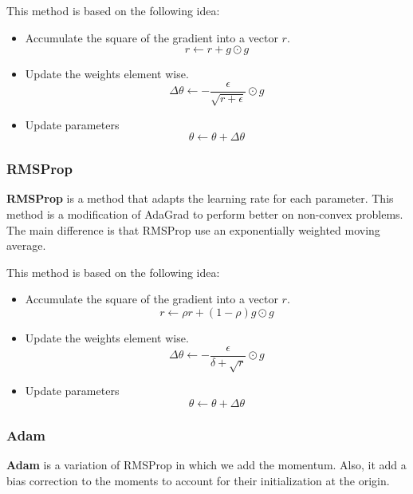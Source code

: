 This method is based on the following idea:
\begin{itemize}
    \item Accumulate the square of the gradient into a vector $r$.
          \begin{equation}
              r \gets r + g \odot g
          \end{equation}
    \item Update the weights element wise.
          \begin{equation}
              \Delta\theta \gets - \frac{\epsilon}{\sqrt{r + \epsilon}} \odot g
          \end{equation}
    \item Update parameters
          \begin{equation}
              \theta \gets \theta + \Delta \theta
          \end{equation}
\end{itemize}
\subsubsection{RMSProp}
\textbf{RMSProp} is a method that adapts the learning rate for each parameter.
This method is a modification of AdaGrad to perform better on non-convex problems.
The main difference is that RMSProp use an exponentially weighted moving average.

This method is based on the following idea:
\begin{itemize}
    \item Accumulate the square of the gradient into a vector $r$.
          \begin{equation}
              r \gets \rho r + (1 - \rho) g \odot g
          \end{equation}
    \item Update the weights element wise.
          \begin{equation}
              \Delta \theta \gets - \frac{\epsilon}{\delta + \sqrt{r}} \odot g
          \end{equation}
    \item Update parameters
          \begin{equation}
              \theta \gets \theta + \Delta \theta
          \end{equation}
\end{itemize}
\subsubsection{Adam}
\textbf{Adam} is a variation of RMSProp in which we add the momentum. Also, it
add a bias correction to the moments to account for their initialization at the
origin.

